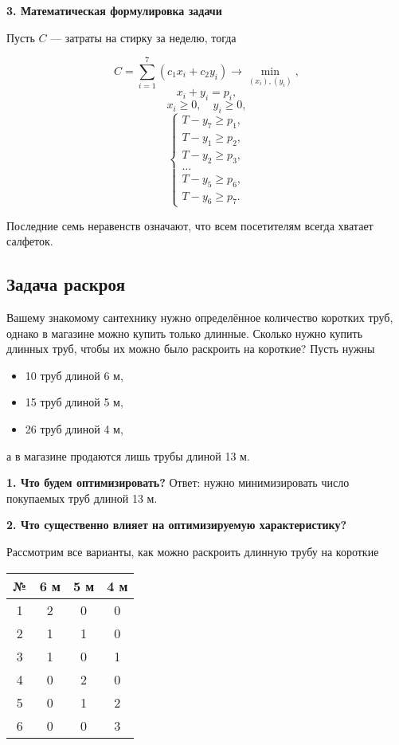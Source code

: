 \bigskip

\textbf{3. Математическая формулировка задачи}

Пусть $C$ --- затраты на стирку за неделю, тогда

\[C = \sum_{i=1}^7 (c_1 x_i + c_2 y_i) \to \min_{(x_i), (y_i)},\]
\[x_i + y_i = p_i,\]
\[x_i \ge 0, \quad y_i \ge 0,\]
\[\begin{cases}
	T - y_7 \ge p_1, \\
	T - y_1 \ge p_2, \\
	T - y_2 \ge p_3, \\
	\dots \\
	T - y_5 \ge p_6, \\
	T - y_6 \ge p_7.
\end{cases}\]

Последние семь неравенств означают, что всем посетителям всегда хватает салфеток.

\subsection{Задача раскроя}\label{pr:cutting_stock}

Вашему знакомому сантехнику нужно определённое количество коротких труб, однако в магазине можно купить только длинные. Сколько нужно купить длинных труб, чтобы их можно было раскроить на короткие? Пусть нужны
\begin{itemize}[nosep]
	\item 10 труб длиной 6 м,
	
	\item 15 труб длиной 5 м,
	
	\item 26 труб длиной 4 м,
\end{itemize}

а в магазине продаются лишь трубы длиной 13 м.

\bigskip

\textbf{1. Что будем оптимизировать?} Ответ: нужно минимизировать число покупаемых труб длиной 13 м.

\bigskip

\textbf{2. Что существенно влияет на оптимизируемую характеристику?}

Рассмотрим все варианты, как можно раскроить длинную трубу на короткие

\begin{table}[h!]
	\centering
	\begin{tabular}{| c | c | c | c | } 
		\hline
		№ & 6 м & 5 м & 4 м \\ 
		\hline
		1 & 2 & 0 & 0 \\\hline
		2 & 1 & 1 & 0 \\\hline
		3 & 1 & 0 & 1 \\\hline
		4 & 0 & 2 & 0 \\\hline
		5 & 0 & 1 & 2 \\\hline
		6 & 0 & 0 & 3 \\\hline
	\end{tabular}
\end{table}

